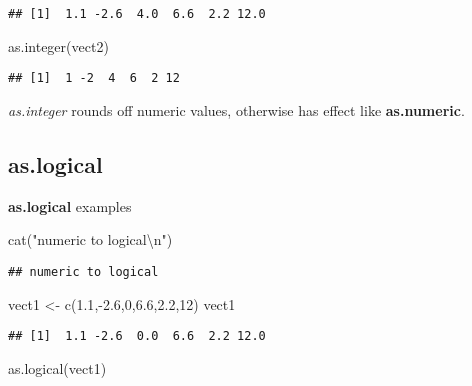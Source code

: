 \documentclass[
]{article}
\newenvironment{Shaded}{\begin{snugshade}}{\end{snugshade}}
\newcommand{\DecValTok}[1]{\textcolor[rgb]{0.00,0.00,0.81}{#1}}
\newcommand{\FloatTok}[1]{\textcolor[rgb]{0.00,0.00,0.81}{#1}}
\newcommand{\FunctionTok}[1]{\textcolor[rgb]{0.00,0.00,0.00}{#1}}
\newcommand{\NormalTok}[1]{#1}
\newcommand{\OtherTok}[1]{\textcolor[rgb]{0.56,0.35,0.01}{#1}}
\newcommand{\SpecialCharTok}[1]{\textcolor[rgb]{0.00,0.00,0.00}{#1}}
\newcommand{\StringTok}[1]{\textcolor[rgb]{0.31,0.60,0.02}{#1}}
\begin{document}
\begin{verbatim}
## [1]  1.1 -2.6  4.0  6.6  2.2 12.0
\end{verbatim}

\begin{Shaded}
\begin{Highlighting}[]
\FunctionTok{as.integer}\NormalTok{(vect2)}
\end{Highlighting}
\end{Shaded}

\begin{verbatim}
## [1]  1 -2  4  6  2 12
\end{verbatim}

\emph{as.integer} rounds off numeric values, otherwise has effect like
\textbf{as.numeric}.

\hypertarget{as.logical}{%
\subsection{as.logical}\label{as.logical}}

\textbf{as.logical} examples

\begin{Shaded}
\begin{Highlighting}[]
\FunctionTok{cat}\NormalTok{(}\StringTok{"numeric to logical}\SpecialCharTok{\textbackslash{}n}\StringTok{"}\NormalTok{)}
\end{Highlighting}
\end{Shaded}

\begin{verbatim}
## numeric to logical
\end{verbatim}

\begin{Shaded}
\begin{Highlighting}[]
\NormalTok{vect1 }\OtherTok{\textless{}{-}} \FunctionTok{c}\NormalTok{(}\FloatTok{1.1}\NormalTok{,}\SpecialCharTok{{-}}\FloatTok{2.6}\NormalTok{,}\DecValTok{0}\NormalTok{,}\FloatTok{6.6}\NormalTok{,}\FloatTok{2.2}\NormalTok{,}\DecValTok{12}\NormalTok{)}
\NormalTok{vect1}
\end{Highlighting}
\end{Shaded}

\begin{verbatim}
## [1]  1.1 -2.6  0.0  6.6  2.2 12.0
\end{verbatim}

\begin{Shaded}
\begin{Highlighting}[]
\FunctionTok{as.logical}\NormalTok{(vect1)}
\end{Highlighting}
\end{Shaded}
\end{document}
